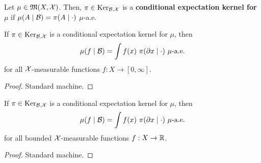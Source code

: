 \begin{definition}
    \label{def:cond-exp-ker}
    \leanok

    Let $\mu\in\mathfrak{M}(X,\mathcal X)$. Then, $\pi\in\text{Ker}_{\mathcal B,\mathcal X}$ is a \textbf{conditional expectation kernel for $\mu$} if $\mu(A\mid \mathcal B)=\pi(A\mid\cdot)$ $\mu$-a.e.
\end{definition}

\begin{lemma}
    \label{lem:cond-exp-proper-ker-lintegral}

    If $\pi \in \text{Ker}_{\mathcal B, \mathcal X}$ is a conditional expectation kernel for $\mu$, then
    $$\mu(f\mid \MCB) = \int f(x)\ \pi(\partial x\mid\cdot)\ \mu\text{-a.e.}$$
    for all $\mathcal X$-measurable functions $f : X \to [0, \infty]$.
\end{lemma}
\begin{proof}

    Standard machine.
\end{proof}

\begin{lemma}
    \label{lem:cond-exp-proper-ker-integral}
    \leanok

    If $\pi \in \text{Ker}_{\mathcal B, \mathcal X}$ is a conditional expectation kernel for $\mu$, then
    $$\mu(f\mid \MCB) = \int f(x)\ \pi(\partial x\mid\cdot)\ \mu\text{-a.e.}$$
    for all bounded $\mathcal X$-measurable functions $f : X \to \mathbb R$.
\end{lemma}
\begin{proof}

    Standard machine.
\end{proof}

